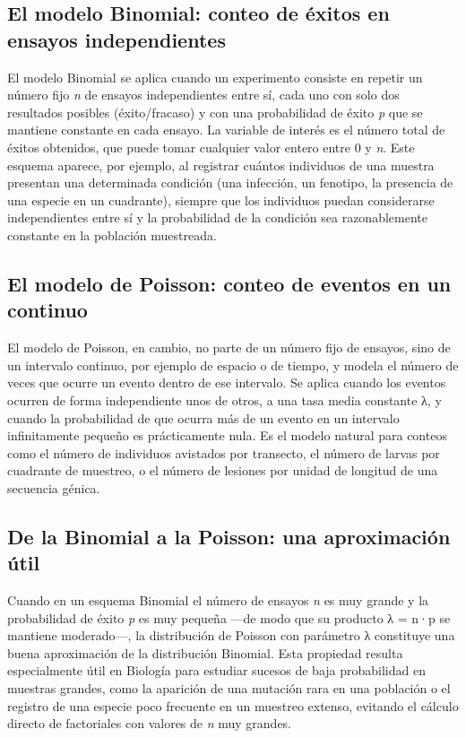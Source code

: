 \documentclass[
  spanish,
  letterpaper,
  DIV=11,
  numbers=noendperiod]{scrreprt}
\begin{document}
\subsection{El modelo Binomial: conteo de éxitos en ensayos
independientes}\label{el-modelo-binomial-conteo-de-uxe9xitos-en-ensayos-independientes}

El modelo Binomial se aplica cuando un experimento consiste en repetir
un número fijo \emph{n} de ensayos independientes entre sí, cada uno con
solo dos resultados posibles (éxito/fracaso) y con una probabilidad de
éxito \emph{p} que se mantiene constante en cada ensayo. La variable de
interés es el número total de éxitos obtenidos, que puede tomar
cualquier valor entero entre 0 y \emph{n}. Este esquema aparece, por
ejemplo, al registrar cuántos individuos de una muestra presentan una
determinada condición (una infección, un fenotipo, la presencia de una
especie en un cuadrante), siempre que los individuos puedan considerarse
independientes entre sí y la probabilidad de la condición sea
razonablemente constante en la población muestreada.

\subsection{El modelo de Poisson: conteo de eventos en un
continuo}\label{el-modelo-de-poisson-conteo-de-eventos-en-un-continuo}

El modelo de Poisson, en cambio, no parte de un número fijo de ensayos,
sino de un intervalo continuo, por ejemplo de espacio o de tiempo, y
modela el número de veces que ocurre un evento dentro de ese intervalo.
Se aplica cuando los eventos ocurren de forma independiente unos de
otros, a una tasa media constante λ, y cuando la probabilidad de que
ocurra más de un evento en un intervalo infinitamente pequeño es
prácticamente nula. Es el modelo natural para conteos como el número de
individuos avistados por transecto, el número de larvas por cuadrante de
muestreo, o el número de lesiones por unidad de longitud de una
secuencia génica.

\subsection{De la Binomial a la Poisson: una aproximación
útil}\label{de-la-binomial-a-la-poisson-una-aproximaciuxf3n-uxfatil}

Cuando en un esquema Binomial el número de ensayos \emph{n} es muy
grande y la probabilidad de éxito \emph{p} es muy pequeña ---de modo que
su producto λ = n·p se mantiene moderado---, la distribución de Poisson
con parámetro λ constituye una buena aproximación de la distribución
Binomial. Esta propiedad resulta especialmente útil en Biología para
estudiar sucesos de baja probabilidad en muestras grandes, como la
aparición de una mutación rara en una población o el registro de una
especie poco frecuente en un muestreo extenso, evitando el cálculo
directo de factoriales con valores de \emph{n} muy grandes.
\end{document}
